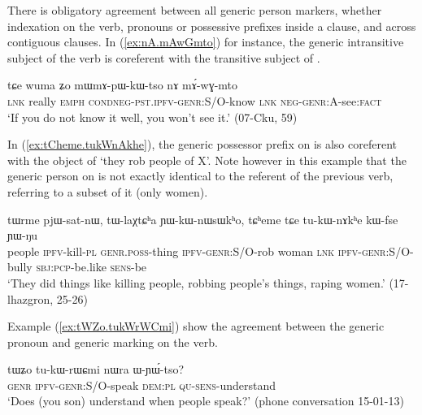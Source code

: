There is obligatory agreement between all generic person markers, whether indexation on the verb, pronouns or possessive prefixes inside a clause, and across contiguous clauses. In (\ref{ex:nA.mAwGmto}) for instance, the generic intransitive subject of the verb  is coreferent with the transitive subject of .

\begin{exe}
\ex   \label{ex:nA.mAwGmto}
 \gll   tɕe wuma ʑo mɯ\redp{}mɤ-pɯ-kɯ-tso nɤ mɤ́-wɣ-mto \\
 \textsc{lnk} really \textsc{emph} \textsc{cond}\redp{}\textsc{neg}-\textsc{pst}.\textsc{ipfv}-\textsc{genr}:S/O-know \textsc{lnk} \textsc{neg}-\textsc{genr}:\textsc{A}-see:\textsc{fact} \\
\glt `If you do not know it well, you won't see it.'   (07-Cku, 59)
\end{exe}

In (\ref{ex:tCheme.tukWnAkhe}), the generic possessor prefix on  is also coreferent with the object of  `they rob people of X'. Note however in this example that the generic person on  is not exactly identical to the referent of the previous verb, referring to a subset of it (only women).

\begin{exe}
\ex   \label{ex:tCheme.tukWnAkhe}
 \gll  tɯrme pjɯ-sat-nɯ, tɯ-laχtɕʰa ɲɯ-kɯ-nɯsɯkʰo, tɕʰeme tɕe tu-kɯ-nɤkʰe kɯ-fse ɲɯ-ŋu \\
 people \textsc{ipfv}-kill-\textsc{pl} \textsc{genr}.\textsc{poss}-thing \textsc{ipfv}-\textsc{genr}:S/O-rob woman \textsc{lnk} \textsc{ipfv}-\textsc{genr}:S/O-bully \textsc{sbj}:\textsc{pcp}-be.like \textsc{sens}-be \\
 \glt `They did things like killing people, robbing people's things, raping women.' (17-lhazgron, 25-26)
\end{exe}

Example (\ref{ex:tWZo.tukWrWCmi}) show the agreement between the generic pronoun  and generic marking on the verb.

\begin{exe}
\ex   \label{ex:tWZo.tukWrWCmi}
 \gll  tɯʑo tu-kɯ-rɯɕmi nɯra ɯ-ɲɯ́-tso? \\
 \textsc{genr} \textsc{ipfv}-\textsc{genr}:S/O-speak \textsc{dem}:\textsc{pl} \textsc{qu}-\textsc{sens}-understand \\
 \glt `Does (you son) understand when people speak?' (phone conversation 15-01-13)
\end{exe}

